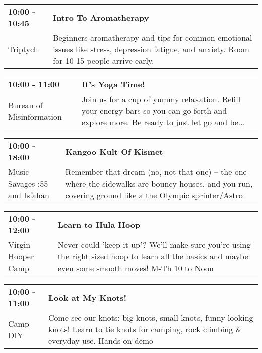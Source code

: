 \begin{tabular}{ p{1in} p{2.2in} }
    \textbf{10:00 - 10:45} & \textbf{Intro To Aromatherapy} \\
    Triptych \newline  & Beginners aromatherapy and tips for common emotional issues like stress, depression fatigue, and anxiety. Room for 10-15 people arrive early. \\
    \hline 
\end{tabular}
    
\begin{tabular}{ p{1in} p{2.2in} }
    \textbf{10:00 - 11:00} & \textbf{It's Yoga Time!} \\
    Bureau of Misinformation \newline  & Join us for a cup of yummy relaxation. Refill your energy bars so you can go forth and explore more. Be ready to just let go and be... \\
    \hline 
\end{tabular}
    
\begin{tabular}{ p{1in} p{2.2in} }
    \textbf{10:00 - 18:00} & \textbf{Kangoo Kult Of Kismet} \\
    Music Savages \newline 8:55 and Isfahan & Remember that dream (no, not that one) -- the one where the sidewalks are bouncy houses, and you run, covering ground like a the Olympic sprinter/Astro \\
    \hline 
\end{tabular}
    
\begin{tabular}{ p{1in} p{2.2in} }
    \textbf{10:00 - 12:00} & \textbf{Learn to Hula Hoop} \\
    Virgin Hooper Camp \newline  & Never could 'keep it up'? We'll make sure you're using the right sized hoop to learn all the basics and maybe even some smooth moves! M-Th 10 to Noon \\
    \hline 
\end{tabular}
    
\begin{tabular}{ p{1in} p{2.2in} }
    \textbf{10:00 - 11:00} & \textbf{Look at My Knots!} \\
    Camp DIY \newline  & Come see our knots: big knots, small knots, funny looking knots! Learn to tie knots for camping, rock climbing \& everyday use. Hands on demo \\
    \hline 
\end{tabular}
    
